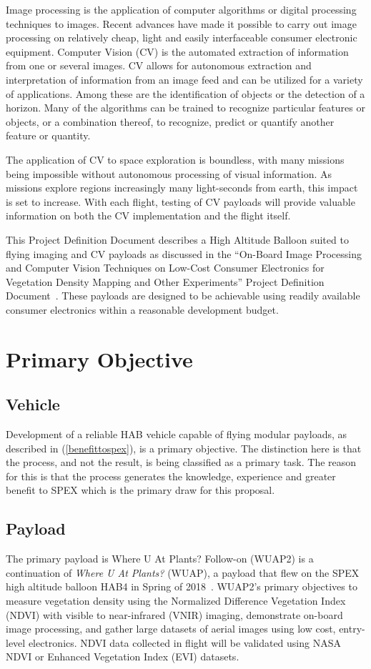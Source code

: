 \documentclass[conference]{IEEEtran} %
\begin{document}
Image processing is the application of computer algorithms or digital processing techniques to images. 
Recent advances have made it possible to carry out image processing on relatively cheap, light and easily interfaceable consumer electronic equipment. 
Computer Vision (CV) is the automated extraction of information from one or several images. 
CV allows for autonomous extraction and interpretation of information from an image feed and can be utilized for a variety of applications. 
Among these are the identification of objects or the detection of a horizon. 
Many of the algorithms can be trained to recognize particular features or objects, or a combination thereof, to recognize, predict or quantify another feature or quantity.

The application of CV to space exploration is boundless, with many missions being impossible without autonomous processing of visual information. 
As missions explore regions increasingly many light-seconds from earth, this impact is set to increase. 
With each flight, testing of CV payloads will provide valuable information on both the CV implementation and the flight itself. 

This Project Definition Document describes a High Altitude Balloon suited to flying imaging and CV payloads as discussed in the ``On-Board Image Processing and Computer Vision Techniques on Low-Cost Consumer Electronics for Vegetation Density Mapping and Other Experiments'' Project Definition Document~\cite{habcvpdd}. 
These payloads are designed to be achievable using readily available consumer electronics within a reasonable development budget. 

\section{Primary Objective}
\subsection{Vehicle}
\label{vehicleobjectives}
Development of a reliable HAB vehicle capable of flying modular payloads, as described in (\autoref{benefittospex}), is a primary objective. 
The distinction here is that the process, and not the result, is being classified as a primary task. 
The reason for this is that the process generates the knowledge, experience and greater benefit to SPEX which is the primary draw for this proposal.

\subsection{Payload}
\label{payloadobjectives}
The primary payload is Where U At Plants? Follow-on (WUAP2) is a continuation of \textit{Where U At Plants?} (WUAP), a payload that flew on the SPEX high altitude balloon  HAB4 in Spring of 2018~\cite{wuaphab4}. 
WUAP2's primary objectives to measure vegetation density using the Normalized Difference Vegetation Index (NDVI) with visible to near-infrared (VNIR) imaging, demonstrate on-board image processing, and gather large datasets of aerial images using low cost, entry-level electronics. 
NDVI data collected in flight will be validated using NASA NDVI or Enhanced Vegetation Index (EVI) datasets.
\end{document}
